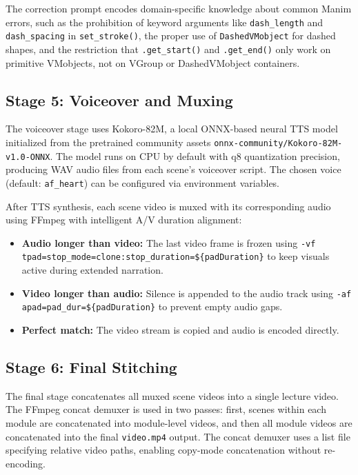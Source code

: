 \documentclass[12pt,a4paper,twoside,openright]{report}
\begin{document}
The correction prompt encodes domain-specific knowledge about common Manim errors, such as the prohibition of keyword arguments like \texttt{dash\_length} and \texttt{dash\_spacing} in \texttt{set\_stroke()}, the proper use of \texttt{DashedVMobject} for dashed shapes, and the restriction that \texttt{.get\_start()} and \texttt{.get\_end()} only work on primitive VMobjects, not on VGroup or DashedVMobject containers.

\subsection{Stage 5: Voiceover and Muxing}

The voiceover stage uses Kokoro-82M, a local ONNX-based neural TTS model initialized from the pretrained community assets \texttt{onnx-community/Kokoro-82M-v1.0-ONNX}. The model runs on CPU by default with q8 quantization precision, producing WAV audio files from each scene's voiceover script. The chosen voice (default: \texttt{af\_heart}) can be configured via environment variables.

After TTS synthesis, each scene video is muxed with its corresponding audio using FFmpeg with intelligent A/V duration alignment:

\begin{itemize}
  \item \textbf{Audio longer than video:} The last video frame is frozen using \texttt{-vf tpad=stop\_mode=clone:stop\_duration=\$\{padDuration\}} to keep visuals active during extended narration.
  \item \textbf{Video longer than audio:} Silence is appended to the audio track using \texttt{-af apad=pad\_dur=\$\{padDuration\}} to prevent empty audio gaps.
  \item \textbf{Perfect match:} The video stream is copied and audio is encoded directly.
\end{itemize}

\subsection{Stage 6: Final Stitching}

The final stage concatenates all muxed scene videos into a single lecture video. The FFmpeg concat demuxer is used in two passes: first, scenes within each module are concatenated into module-level videos, and then all module videos are concatenated into the final \texttt{video.mp4} output. The concat demuxer uses a list file specifying relative video paths, enabling copy-mode concatenation without re-encoding.
\end{document}
